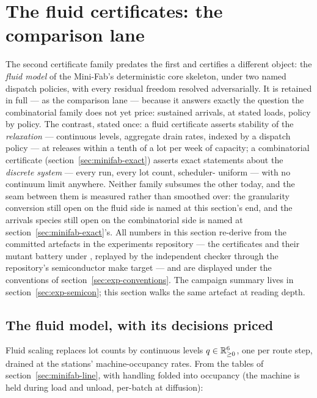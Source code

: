\section{The fluid certificates: the comparison lane}
\label{sec:minifab-certs}

The second certificate family predates the first and certifies a
different object: the \emph{fluid model} of the Mini-Fab's
deterministic core skeleton, under two named dispatch policies, with
every residual freedom resolved adversarially. It is retained in
full --- as the comparison lane --- because it answers exactly the
question the combinatorial family does not yet price: sustained
arrivals, at stated loads, policy by policy. The contrast, stated
once: a fluid certificate asserts stability of the
\emph{relaxation} --- continuous levels, aggregate drain rates,
indexed by a dispatch policy --- at releases within a tenth of a lot
per week of capacity; a combinatorial certificate
(section~\ref{sec:minifab-exact}) asserts exact statements about the
\emph{discrete system} --- every run, every lot count, scheduler-%
uniform --- with no continuum limit anywhere. Neither family
subsumes the other today, and the seam between them is measured
rather than smoothed over: the granularity conversion still open on
the fluid side is named at this section's end, and the arrivals
species still open on the combinatorial side is named at
section~\ref{sec:minifab-exact}'s. All numbers in this section
re-derive from the committed artefacts in the experiments repository
--- the certificates and their mutant battery under
, replayed by the independent checker
through the repository's semiconductor make target --- and are
displayed under the conventions of
section~\ref{sec:exp-conventions}. The campaign summary lives in
section~\ref{sec:exp-semicon}; this section walks the same artefact
at reading depth.

\subsection{The fluid model, with its decisions priced}

Fluid scaling replaces lot counts by continuous levels $q \in
\mathbb{R}_{\ge 0}^6$, one per route step, drained at the stations'
machine-occupancy rates. From the tables of
section~\ref{sec:minifab-line}, with handling folded into occupancy
(the machine is held during load and unload, per-batch at
diffusion):

